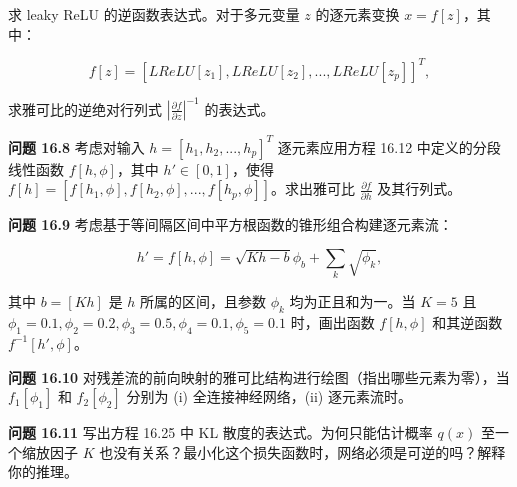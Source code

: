 求 leaky ReLU 的逆函数表达式。对于多元变量 \(z\) 的逐元素变换 \(x = f[z]\)，其中：

\[
f[z] = [LReLU[z_1], LReLU[z_2], ..., LReLU[z_p]]^T, \tag{16.32}
\]

求雅可比的逆绝对行列式 \(\left| \frac{\partial f}{\partial z} \right|^{-1}\) 的表达式。

\textbf{问题 16.8} 考虑对输入 \(h = [h_1, h_2, ..., h_p]^T\) 逐元素应用方程 16.12 中定义的分段线性函数 \(f[h, \phi]\)，其中 \(h' \in [0, 1]\)，使得 \(f[h] = [f[h_1, \phi], f[h_2, \phi], ..., f[h_p, \phi]]\)。求出雅可比 \(\frac{\partial f}{\partial h}\) 及其行列式。

\textbf{问题 16.9} 考虑基于等间隔区间中平方根函数的锥形组合构建逐元素流：

\[
h' = f[h, \phi] = \sqrt{K h - b} \phi_b + \sum_{k} \sqrt{\phi_k}, \tag{16.33}
\]

其中 \(b = [Kh]\) 是 \(h\) 所属的区间，且参数 \(\phi_k\) 均为正且和为一。当 \(K = 5\) 且 \(\phi_1 = 0.1, \phi_2 = 0.2, \phi_3 = 0.5, \phi_4 = 0.1, \phi_5 = 0.1\) 时，画出函数 \(f[h, \phi]\) 和其逆函数 \(f^{-1}[h', \phi]\)。

\textbf{问题 16.10} 对残差流的前向映射的雅可比结构进行绘图（指出哪些元素为零），当 \(f_1[\phi_1]\) 和 \(f_2[\phi_2]\) 分别为 (i) 全连接神经网络，(ii) 逐元素流时。

\textbf{问题 16.11} 写出方程 16.25 中 KL 散度的表达式。为何只能估计概率 \(q(x)\) 至一个缩放因子 \(K\) 也没有关系？最小化这个损失函数时，网络必须是可逆的吗？解释你的推理。
